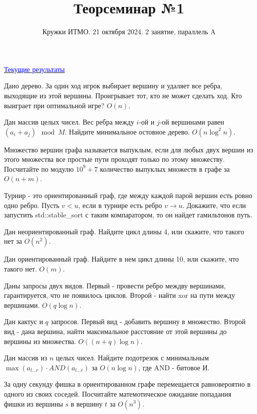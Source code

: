\documentclass{article}
\title{Теорсеминар №1}
\author{Кружки ИТМО. 21 октября 2024. 2 занятие, параллель A}
\date{}
\begin{document}
	
	\maketitle
	
	\href{https://docs.google.com/spreadsheets/d/1qnffTfPXIDFcwWoBrO4RRApMNMjeVCJ56XNfXEh3JYo/edit?usp=sharing}{\textcolor{blue}{Текущие результаты}}

	
	\begin{tasks}
		\item Дано дерево. За один ход игрок выбирает вершину и удаляет все ребра, выходящие из этой вершины. Проигрывает тот, кто не может сделать ход. Кто выиграет при оптимальной игре? $O(n)$.
		\item Дан массив целых чисел. Вес ребра между $i$-ой и $j$-ой вершинами равен $(a_i + a_j) \mod M$. Найдите минимальное остовное дерево. $O(n \log^2 n)$.
		\item Множество вершин графа называется выпуклым, если для любых двух вершин из этого множества все простые пути проходят только по этому множеству. Посчитайте по модулю $10^9 + 7$ количество выпуклых множеств в графе за $O(n + m)$.
		\item Турнир - это ориентированный граф, где между каждой парой вершин есть ровно одно ребро. Пусть $v < u$, если в турнире есть ребро $v \rightarrow u$. Докажите, что если запустить std::stable\_sort с таким компаратором, то он найдет гамильтонов путь.

		\item Дан неориентированный граф. Найдите цикл длины 4, или скажите, что такого нет за $O(n^2)$.
		\item Дан ориентированный граф. Найдите в нем цикл длины 10, или скажите, что такого нет. $O(m)$.
		\item Даны запросы двух видов. Первый - провести ребро междву вершинами, гарантируется, что не появилось циклов. Второй - найти xor на пути между вершинами. $O(q \log n)$.
		\item Дан кактус и $q$ запросов. Первый вид - добавить вершину в множество. Второй вид - дана вершина, найти максимальное расстояние от этой вершины до вершины из множества. $O((n + q) \log n)$.
		\item Дан массив из $n$ целых чисел. Найдите подотрезок с минимальным $\max(a_{l...r}) \cdot AND(a_{l...r})$ за $O(n \log n)$, где AND - битовое И.
		\item За одну секунду фишка в ориентированном графе  перемещается равновероятно в одного из своих соседей. Посчитайте матемотическое ожидание попадания фишки из вершины $s$ в вершину $t$ за $O(n^3)$.	\end{tasks}
\end{document}

